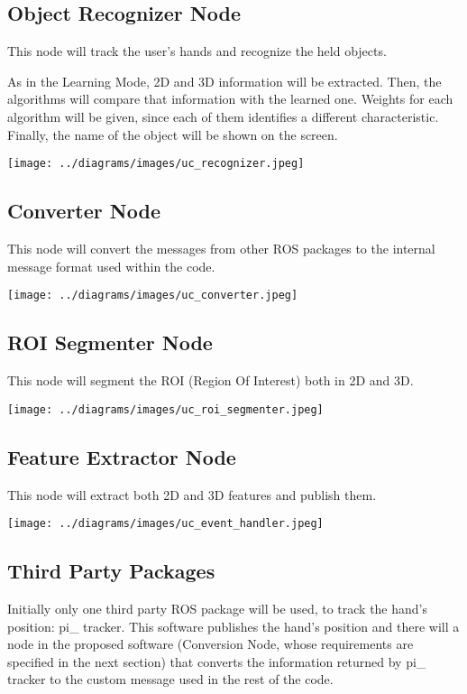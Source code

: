 \documentclass{article}
\begin{document}
\subsection{Object Recognizer Node} 
\hspace{0.5cm}This node will track the user's hands and recognize the held objects. 

As in the Learning Mode, 2D and 3D information will be extracted. Then, the algorithms will compare that information with the learned one. Weights for each algorithm will be given, since each of them identifies a different characteristic. Finally, the name of the object will be shown on the screen. 

\begin{center}
	\texttt{[image: ../diagrams/images/uc\_recognizer.jpeg]}
\end{center}

\subsection{Converter Node}

This node will convert the messages from other ROS packages to the internal message format used within the code. 

\begin{center}
	\texttt{[image: ../diagrams/images/uc\_converter.jpeg]}
\end{center}
	
\subsection{ROI Segmenter Node}
This node will segment the ROI (Region Of Interest) both in 2D and 3D.

\begin{center}
	\texttt{[image: ../diagrams/images/uc\_roi\_segmenter.jpeg]}
\end{center}

\subsection{Feature Extractor Node}
This node will extract both 2D and 3D features and publish them. 

\begin{center}
	\texttt{[image: ../diagrams/images/uc\_event\_handler.jpeg]}
\end{center}

\subsection{Third Party Packages}
\hspace{0.5cm}Initially only one third party ROS package will be used, to track the hand's position: pi\_ tracker. This software publishes the hand's position and there will a node in the proposed software (Conversion Node, whose requirements are specified in the next section) that converts the information returned by pi\_ tracker to the custom message used in the rest of the code.  
\end{document}
